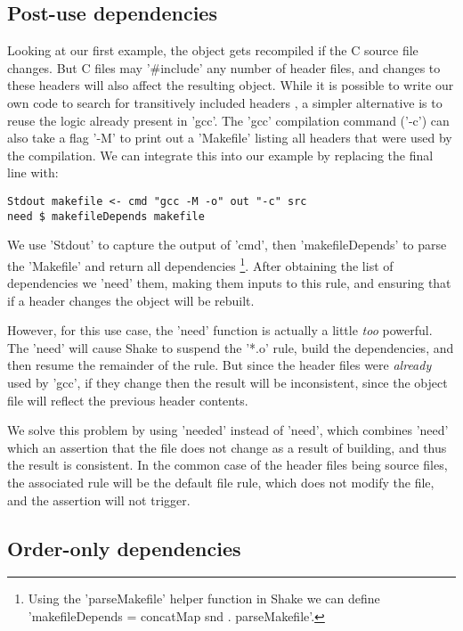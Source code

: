 \subsection{Post-use dependencies}

Looking at our first example, the object gets recompiled if the C source file
changes. But C files may \lst'#include' any number of header files, and changes
to these headers will also affect the resulting object. While it is possible to
write our own code to search for transitively included headers
\cite[\S6.4]{shake}, a simpler alternative is to reuse the logic already present
in \lst'gcc'. The \lst'gcc' compilation command (\lst'-c') can also take a flag
\lst'-M' to print out a \lst'Makefile' listing all headers that were used by the
compilation. We can integrate this into our example by replacing the final
line with:

\begin{lstlisting}
Stdout makefile <- cmd "gcc -M -o" out "-c" src
need $ makefileDepends makefile
\end{lstlisting}

\noindent We use \lst'Stdout' to capture the output of \lst'cmd', then
\lst'makefileDepends' to parse the \lst'Makefile' and return all dependencies
\footnote{Using the \lst'parseMakefile' helper function in Shake we can define
\lst'makefileDepends = concatMap snd . parseMakefile'.}. After obtaining the
list of dependencies we \lst'need' them, making them inputs to this rule, and
ensuring that if a header changes the object will be rebuilt.

However, for this use case, the \lst'need' function is actually a little
\emph{too} powerful. The \lst'need' will cause Shake to suspend the \lst'*.o'
rule, build the dependencies, and then resume the remainder of the rule. But
since the header files were \emph{already} used by \lst'gcc', if they change
then the result will be inconsistent, since the object file will reflect the
previous header contents.

We solve this problem by using \lst'needed' instead of \lst'need', which
combines \lst'need' which an assertion that the file does not change as a result
of building, and thus the result is consistent. In the common case of the header
files being source files, the associated rule will be the default file rule,
which does not modify the file, and the assertion will not trigger.

\subsection{Order-only dependencies}

